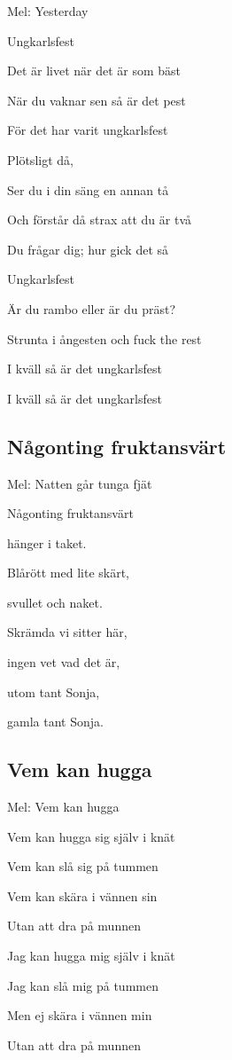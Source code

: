 Mel: Yesterday\bigskip


Ungkarlsfest

Det är livet när det är som bäst

När du vaknar sen så är det pest

För det har varit ungkarlsfest\bigskip


Plötsligt då,

Ser du i din säng en annan tå

Och förstår då strax att du är två

Du frågar dig; hur gick det så\bigskip


Ungkarlsfest

Är du rambo eller är du präst?

Strunta i ångesten och fuck the rest

I kväll så är det ungkarlsfest

I kväll så är det ungkarlsfest

\subsection{\textbf{Någonting fruktansvärt}}


Mel: Natten går tunga fjät\bigskip


Någonting fruktansvärt

hänger i taket.

Blårött med lite skärt,

svullet och naket.

Skrämda vi sitter här,

ingen vet vad det är,

utom tant Sonja,

gamla tant Sonja. 


\subsection{\textbf{Vem kan hugga}}

Mel: Vem kan hugga\bigskip


Vem kan hugga sig själv i knät

Vem kan slå sig på tummen

Vem kan skära i vännen sin

Utan att dra på munnen\bigskip


Jag kan hugga mig själv i knät

Jag kan slå mig på tummen

Men ej skära i vännen min

Utan att dra på munnen

